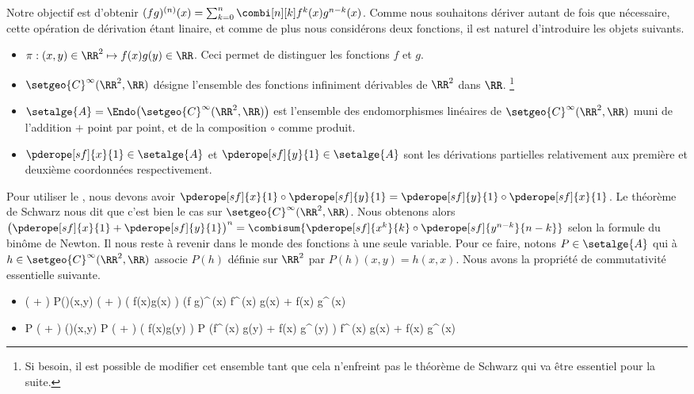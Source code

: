 Notre objectif est d'obtenir
$(fg)^{(n)} (x) = \sum_{k=0}^n \combi[n][k] f^k(x) g^{n-k}(x)$.
%
Comme nous souhaitons dériver autant de fois que nécessaire, cette opération de dérivation étant linaire,
et
comme de plus nous considérons deux fonctions,
il est naturel d'introduire les objets suivants.
%
\begin{itemize}
	\item $\pi: (x,y) \in \RR^2 \mapsto f(x) g(y) \in \RR$. Ceci permet de distinguer les fonctions $f$ et $g$.

	\item $\setgeo{C}^{\infty}(\RR^2 , \RR)$ désigne l'ensemble des fonctions infiniment dérivables de $\RR^2$ dans $\RR$.%
	\footnote{
		Si besoin, il est possible de modifier cet ensemble tant que cela n'enfreint pas le théorème de Schwarz qui va être essentiel pour la suite.
	}

	\item $\setalge{A} = \Endo \big( \setgeo{C}^{\infty}(\RR^2 , \RR) \big)$ est l'ensemble des endomorphismes linéaires de $\setgeo{C}^{\infty}(\RR^2 , \RR)$ muni de l'addition $+$ point par point, et de la composition $\circ$ comme produit.

	\item $\pderope[sf]{x}{1} \in \setalge{A}$ et $\pderope[sf]{y}{1} \in \setalge{A}$ sont les dérivations partielles relativement aux première et deuxième coordonnées respectivement. 
\end{itemize}


Pour utiliser le , nous devons avoir $\pderope[sf]{x}{1} \circ \pderope[sf]{y}{1} = \pderope[sf]{y}{1} \circ \pderope[sf]{x}{1}$. Le théorème de Schwarz nous dit que c'est bien le cas sur $\setgeo{C}^{\infty}(\RR^2 , \RR)$.
%
Nous obtenons alors
$\big( \pderope[sf]{x}{1} + \pderope[sf]{y}{1} \big)^n = \combisum{ \pderope[sf]{x^k}{k} \circ \pderope[sf]{y^{n-k}}{n-k}}$
selon la formule du binôme de Newton.
%
Il nous reste à revenir dans le monde des fonctions à une seule variable. Pour ce faire, notons $P \in \setalge{A}$ qui à $h \in \setgeo{C}^{\infty}(\RR^2 , \RR)$ associe $P(h)$ définie sur $\RR^2$ par $P(h)(x,y) = h(x, x)$.
%
Nous avons la propriété de commutativité essentielle suivante.
%
\begin{itemize}
	\item
	\begin{stepcalc}[style=sar]
		\big(  +  \big) \circ P(\pi)(x,y)
	\explnext{}
		\big(  +  \big) \big( f(x)g(x) \big)
	\explnext{}
		(f g)^{\,\prime}(x)
	\explnext{}
		f^{\,\prime}(x) g(x) + f(x) g^{\,\prime}(x)
	\end{stepcalc}


	\item
	\begin{stepcalc}[style=sar]
		P \circ \big(  +  \big) (\pi)(x,y)
	\explnext{}
		P \circ \big(  +  \big) \big( f(x)g(y) \big)
	\explnext{}
		P \big(f^{\,\prime}(x) g(y) + f(x) g^{\,\prime}(y) \big)
	\explnext{}
		f^{\,\prime}(x) g(x) + f(x) g^{\,\prime}(x)
	\end{stepcalc}
\end{itemize}


